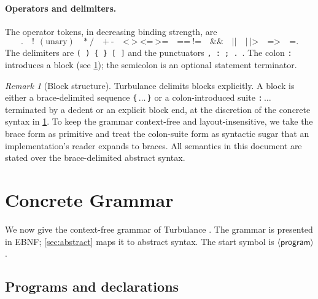 \documentclass[11pt,a4paper]{article}
\theoremstyle{plain}
\theoremstyle{definition}
\theoremstyle{remark}
\newtheorem{remark}[theorem]{Remark}
\newcommand{\nt}[1]{\ensuremath{\langle\textsf{#1}\rangle}}  %
\begin{document}
\paragraph{Operators and delimiters.}
The operator tokens, in decreasing binding strength, are
\[
\texttt{.}\quad \texttt{!}\ \ (\text{unary})\quad \texttt{*}\ \texttt{/}\quad
\texttt{+}\ \texttt{-}\quad \texttt{<}\ \texttt{>}\ \texttt{<=}\ \texttt{>=}
\quad \texttt{==}\ \texttt{!=}\quad \texttt{\&\&}\quad \texttt{||}\quad
\texttt{|}\ \texttt{|>}\quad \texttt{=>}\quad \texttt{=}.
\]
The delimiters are \texttt{( ) \{ \} [ ]} and the punctuators
\texttt{,\ :\ ;\ .}\ . The colon \texttt{:} introduces a block (see
\cref{sec:concrete}); the semicolon is an optional statement terminator.

\begin{remark}[Block structure]
\label{rem:layout}
Turbulance delimits blocks explicitly. A block is either a brace-delimited
sequence \texttt{\{}\,$\dots$\,\texttt{\}} or a colon-introduced suite
\texttt{:}\,$\dots$ terminated by a dedent or an explicit block end, at the
discretion of the concrete syntax in \cref{sec:concrete}. To keep the grammar
context-free and layout-insensitive, we take the brace form as primitive and
treat the colon-suite form as syntactic sugar that an implementation's reader
expands to braces. All semantics in this document are stated over the
brace-delimited abstract syntax.
\end{remark}

\section{Concrete Grammar}
\label{sec:concrete}

We now give the context-free grammar of Turbulance \citep{chomsky1956,aho2006}.
The grammar is presented in EBNF; \cref{sec:abstract} maps it to abstract
syntax. The start symbol is \nt{program}.

\subsection{Programs and declarations}
\end{document}
